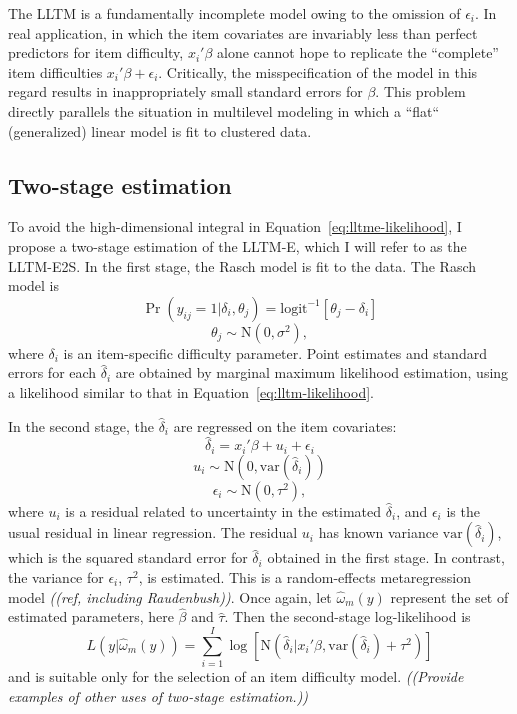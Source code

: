 The LLTM is a fundamentally incomplete model owing to the omission of $\epsilon_i$. In real application, in which the item covariates are invariably less than perfect predictors for item difficulty, $x_i' \beta$ alone cannot hope to replicate the ``complete'' item difficulties $x_i' \beta + \epsilon_i$. Critically, the misspecification of the model in this regard results in inappropriately small standard errors for $\beta$. This problem directly parallels the situation in multilevel modeling in which a ``flat`` (generalized) linear model is fit to clustered data. 




\subsection{Two-stage estimation}

To avoid the high-dimensional integral in Equation~\ref{eq:lltme-likelihood}, I propose a two-stage estimation of the LLTM-E, which I will refer to as the LLTM-E2S.
In the first stage, the Rasch model is fit to the data. The Rasch model is
\begin{equation}
	\Pr(y_{ij} = 1 | \delta_i, \theta_j) =
	\mathrm{logit}^{-1} \left [ \theta_j - \delta_i \right ]
\end{equation}
\begin{equation}
	\theta_j \sim \mathrm{N}(0, \sigma^2)
,\end{equation} 
where $\delta_i$ is an item-specific difficulty parameter.  Point estimates and standard errors for each $\hat \delta_i$ are obtained by marginal maximum likelihood estimation, using a likelihood similar to that in Equation~\ref{eq:lltm-likelihood}.

In the second stage, the $\hat \delta_i$ are regressed on the item covariates:
\begin{equation}
	\hat \delta_i = x_i'\beta + u_i + \epsilon_i
\end{equation}
\begin{equation}
	u_i \sim \mathrm{N}(0, \mathrm{var}(\hat \delta_i))
\end{equation}
\begin{equation}
	\epsilon_i \sim \mathrm{N}(0, \tau^2)
,\end{equation}
where $u_i$ is a residual related to uncertainty in the estimated $\hat \delta_i$, and $\epsilon_i$ is the usual residual in linear regression. 
The residual $u_i$ has known variance $\mathrm{var}(\hat \delta_i)$, which is the squared standard error for $\hat \delta_i$ obtained in the first stage. 
In contrast, the variance for $\epsilon_i$, $\tau^2$, is estimated.
This is a random-effects metaregression model \emph{((ref, including Raudenbush))}.
Once again, let $\hat \omega_m(y)$ represent the set of estimated parameters, here $\hat \beta$ and $\hat \tau$. 
Then the second-stage log-likelihood is
\begin{equation}
	L(y | \hat \omega_m(y)) = \sum_{i=1}^I \log 
	[ \mathrm{N}(\hat \delta_i | x_i'\beta, \mathrm{var}(\hat \delta_i) + \tau^2) ]
\end{equation}
and is suitable only for the selection of an item difficulty model.
\emph{((Provide examples of other uses of two-stage estimation.))}


